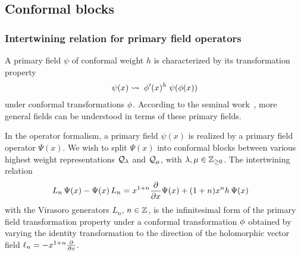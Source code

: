 \documentclass[oneside,english]{amsart}
\numberwithin{equation}{section}
\numberwithin{figure}{section}
\theoremstyle{plain}
\theoremstyle{plain}
\theoremstyle{plain}
\theoremstyle{remark}
\theoremstyle{plain}
\theoremstyle{plain}
\theoremstyle{plain}
\theoremstyle{plain}
\theoremstyle{plain}
\theoremstyle{plain}
\theoremstyle{plain}
\theoremstyle{plain}
\begin{document}
\subsection{Conformal blocks}

\subsubsection{\textbf{Intertwining relation for primary field operators}}
A primary field $\psi$ of conformal weight $h$ is characterized by its
transformation property
\begin{align*}
\psi(x)\rightsquigarrow\;\phi'(x)^{h}\;\psi(\phi(x)) 
\end{align*}
under conformal transformations $\phi$.
According to the seminal work~\cite{BPZ-infinite_conformal_symmetry_in_2D_QFT},
more general fields can be understood in terms of these primary fields.

In the operator formalism, a primary field $\psi(x)$ is realized by a primary field
operator $\Psi(x)$. We wish to split $\Psi(x)$
into conformal blocks between various highest weight representations $\mathcal{Q}_{\lambda}$ and
$\mathcal{Q}_{\mu}$, with $\lambda,\mu\in\mathbb{Z}_{\geq 0}$.
The intertwining relation
\begin{align}
L_{n}\,\Psi(x)-\Psi(x)\,L_{n}=\; & x^{1+n}\frac{\partial}{\partial x}\Psi(x)+(1+n)x^{n}h\,\Psi(x)\label{eq: intertwining relation}
\end{align}
with the Virasoro generators $L_{n}$, $n \in \mathbb{Z}$, is the infinitesimal form of
the primary field transformation property
under a conformal transformation $\phi$ obtained
by varying the identity transformation to the direction of the holomorphic vector
field $\ell_{n}=-x^{1+n}\frac{\partial}{\partial x}$.
\end{document}
